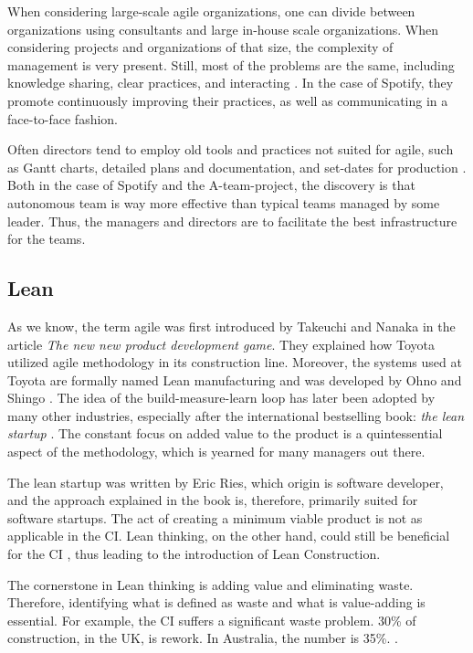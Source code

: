 When considering large-scale agile organizations, one can divide between organizations using consultants and large in-house scale organizations. When considering projects and organizations of that size, the complexity of management is very present. Still, most of the problems are the same, including knowledge sharing, clear practices, and interacting \cite{smite2019spotify}. In the case of Spotify, they promote continuously improving their practices, as well as communicating in a face-to-face fashion.

Often directors tend to employ old tools and practices not suited for agile, such as Gantt charts, detailed plans and documentation, and set-dates for production \cite{benjaminsen2019}. Both in the case of Spotify and the A-team-project, the discovery is that autonomous team is way more effective than typical teams managed by some leader. Thus, the managers and directors are to facilitate the best infrastructure for the teams. 

\subsection{Lean}\label{sec:lean}
As we know, the term agile was first introduced by Takeuchi and Nanaka in the article \textit{The new new product development game}. They explained how Toyota utilized agile methodology in its construction line. Moreover, the systems used at Toyota are formally named Lean manufacturing and was developed by Ohno and Shingo \cite{becker1998lean}. The idea of the build-measure-learn loop has later been adopted by many other industries, especially after the international bestselling book: \textit{the lean startup} \cite{ries2011lean}. The constant focus on added value to the product is a quintessential aspect of the methodology, which is yearned for many managers out there. 

The lean startup was written by Eric Ries, which origin is software developer, and the approach explained in the book is, therefore, primarily suited for software startups. The act of creating a minimum viable product is not as applicable in the CI. Lean thinking, on the other hand, could still be beneficial for the CI \cite{owen2006agile}, thus leading to the introduction of Lean Construction. 

The cornerstone in Lean thinking is adding value and eliminating waste. Therefore, identifying what is defined as waste and what is value-adding is essential. For example, the CI suffers a significant waste problem. 30\% of construction, in the UK, is rework. In Australia, the number is 35\%. \cite{aziz2013applying}. 

